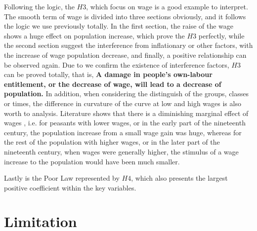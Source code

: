 Following the logic, the $H3$, which focus on wage is a good example to interpret. The smooth term of wage is divided into three sections obviously, and it follows the logic we use previously totally. In the first section, the raise of the wage shows a huge effect on population increase, which prove the $H3$ perfectly, while the second section suggest  the interference from inflationary or other factors, with the increase of wage population decrease, and finally, a positive relationship can be observed again. Due to we confirm the existence of interference factors, $H3$ can be proved totally, that is, \textbf{A damage in people's own-labour entitlement, or the decrease of wage, will lead to a decrease of population.} In addition, when considering the distinguish of the groups, classes or times, the difference in curvature of the curve at low and high wages is also worth to analysis. Literature shows that there is a diminishing marginal effect of wages \citep{li2012capital}, i.e. for peasants with lower wages, or in the early part of the nineteenth century, the population increase from a small wage gain was huge, whereas for the rest of the population with higher wages, or in the later part of the nineteenth century, when wages were generally higher, the stimulus of a wage increase to the population would have been much smaller.

Lastly is the Poor Law represented by $H4$, which also presents the largest positive coefficient within the key variables. 

\newpage

\section{Limitation}




